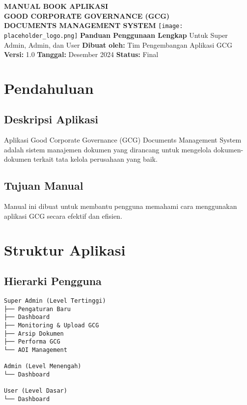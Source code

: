 \documentclass[12pt,a4paper]{article}
\begin{document}
\begin{titlepage}
\centering
\vspace*{2cm}
{\Huge\bfseries\color{darkblue} MANUAL BOOK APLIKASI\\[0.5cm] GOOD CORPORATE GOVERNANCE (GCG)\\[0.5cm] DOCUMENTS MANAGEMENT SYSTEM}
\vspace{2cm}
\texttt{[image: placeholder\_logo.png]}
\vspace{2cm}
{\Large\bfseries Panduan Penggunaan Lengkap}
\vspace{1cm}
{\large Untuk Super Admin, Admin, dan User}
\vfill
{\large \textbf{Dibuat oleh:} Tim Pengembangan Aplikasi GCG}
\vspace{0.5cm}
{\large \textbf{Versi:} 1.0}
\vspace{0.5cm}
{\large \textbf{Tanggal:} Desember 2024}
\vspace{0.5cm}
{\large \textbf{Status:} Final}
\vspace{1cm}
\end{titlepage}

\tableofcontents
\newpage

\section{Pendahuluan}
\subsection{Deskripsi Aplikasi}
Aplikasi Good Corporate Governance (GCG) Documents Management System adalah sistem manajemen dokumen yang dirancang untuk mengelola dokumen-dokumen terkait tata kelola perusahaan yang baik.

\subsection{Tujuan Manual}
Manual ini dibuat untuk membantu pengguna memahami cara menggunakan aplikasi GCG secara efektif dan efisien.

\section{Struktur Aplikasi}
\subsection{Hierarki Pengguna}
\begin{verbatim}
Super Admin (Level Tertinggi)
├── Pengaturan Baru
├── Dashboard
├── Monitoring & Upload GCG
├── Arsip Dokumen
├── Performa GCG
└── AOI Management

Admin (Level Menengah)
└── Dashboard

User (Level Dasar)
└── Dashboard
\end{verbatim}
\end{document}

